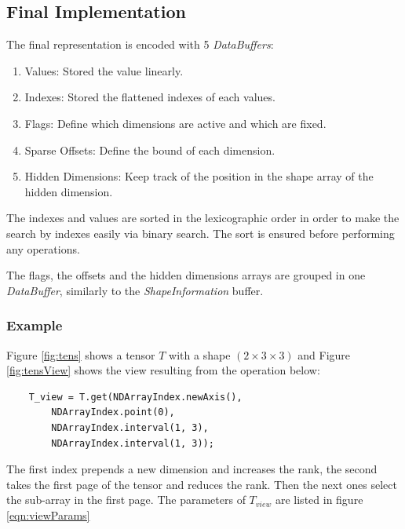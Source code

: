 \subsection{Final Implementation}
	
	The final representation is encoded with 5 \textit{DataBuffers}:
	\begin{enumerate}
		\item Values: Stored the value linearly.
		\item Indexes: Stored the flattened indexes of each values.
		\item Flags: Define which dimensions are active and which are fixed.
		\item Sparse Offsets: Define the bound of each dimension.
		\item Hidden Dimensions: Keep track of the position in the shape array of the hidden dimension.
	\end{enumerate}
	
		The indexes and values are sorted in the lexicographic order in order to make the search by indexes easily via binary search. The sort is ensured before performing any operations.
		
		The flags, the offsets and the hidden dimensions arrays are grouped in one \textit{DataBuffer}, similarly to the \textit{ShapeInformation} buffer.
		
\subsubsection{Example}
Figure \ref{fig:tens} shows a tensor $T$ with a shape $(2\times 3\times 3)$ and Figure \ref{fig:tensView} shows the view resulting from the operation below:

\begin{lstlisting}
	T_view = T.get(NDArrayIndex.newAxis(), 
		NDArrayIndex.point(0),
		NDArrayIndex.interval(1, 3), 
		NDArrayIndex.interval(1, 3));
\end{lstlisting}

The first index prepends a new dimension and increases the rank, the second takes the first page of the tensor and reduces the rank. Then the next ones select the sub-array in the first page. The parameters of $T_{view}$ are listed in figure \ref{eqn:viewParams} 


